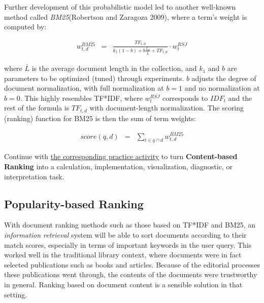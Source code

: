\documentclass[
  letterpaper,
]{scrbook}
\begin{document}
Further development of this probabilistic model led to another
well-known method called \emph{BM25}(Robertson and Zaragoza 2009), where
a term's weight is computed by:

\[\begin{aligned}
w^{BM25}_{t,d}
& = &
\frac{TF_{t,d}}{k_1(1-b)+b\frac{L_d}{\bar{L}}+TF_{t,d}}
\cdot w^{RSJ}_t
\end{aligned}\]

where \(\bar{L}\) is the average document length in the collection, and
\(k_1\) and \(b\) are parameters to be optimized (tuned) through
experiments. \(b\) adjusts the degree of document normalization, with
full normalization at \(b=1\) and no normalization at \(b=0\). This
highly resembles TF*IDF, where \(w^{RSJ}_t\) corresponds to \(IDF_t\)
and the rest of the formula is \(TF_{t,d}\) with document-length
normalization. The scoring (ranking) function for BM25 is then the sum
of term weights:

\[\begin{aligned}
score(q,d) & = & \sum_{t \in q \cap d} w^{BM25}_{t,d}
\end{aligned}\]

\begin{tcolorbox}[enhanced jigsaw, arc=.35mm, bottomrule=.15mm, bottomtitle=1mm, breakable, colback=white, colbacktitle=quarto-callout-tip-color!10!white, colframe=quarto-callout-tip-color-frame, coltitle=black, left=2mm, leftrule=.75mm, opacityback=0, opacitybacktitle=0.6, rightrule=.15mm, title=\textcolor{quarto-callout-tip-color}{\faLightbulb}\hspace{0.5em}{Put it into practice}, titlerule=0mm, toprule=.15mm, toptitle=1mm]

Continue with \hyperref[sec-pr-12-content-based-ranking]{the
corresponding practice activity} to turn \textbf{Content-based Ranking}
into a calculation, implementation, visualization, diagnostic, or
interpretation task.

\end{tcolorbox}

\subsection{Popularity-based Ranking}\label{popularity-based-ranking}

With document ranking methods such as those based on TF*IDF and BM25, an
\emph{information retrieval} system will be able to sort documents
according to their match scores, especially in terms of important
keywords in the user query. This worked well in the traditional library
context, where documents were in fact selected publications such as
books and articles. Because of the editorial processes these
publications went through, the contents of the documents were
trustworthy in general. Ranking based on document content is a sensible
solution in that setting.
\end{document}
